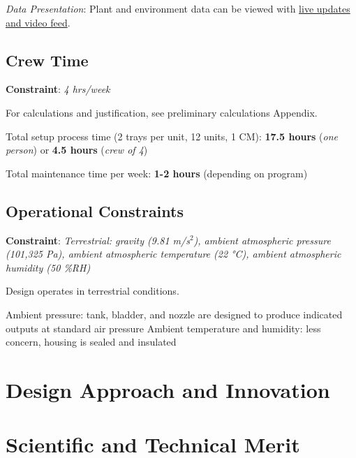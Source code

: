 \documentclass{../tex/report}
\begin{document}
\textit{Data Presentation}: Plant and environment data can be viewed with \uline{live updates and video feed}.

\subsection{Crew Time}

\textbf{Constraint}: \textit{4 hrs/week}

For calculations and justification, see preliminary calculations Appendix.

Total setup process time (2 trays per unit, 12 units, 1 CM): \textbf{17.5 hours} (\textit{one person}) or \textbf{4.5 hours} (\textit{crew of 4})

Total maintenance time per week: \textbf{1-2 hours} (depending on program)

\subsection{Operational Constraints} 

\textbf{Constraint}: \textit{Terrestrial: gravity (9.81 m/s${}^2$), ambient atmospheric pressure (101,325 Pa), ambient atmospheric temperature (22 °C), ambient atmospheric humidity (50 \%RH)}

Design operates in terrestrial conditions.

Ambient pressure: tank, bladder, and nozzle are designed to produce indicated outputs at standard air pressure
Ambient temperature and humidity: less concern, housing is sealed and insulated

\section{Design Approach and Innovation}



\section{Scientific and Technical Merit}
\end{document}
